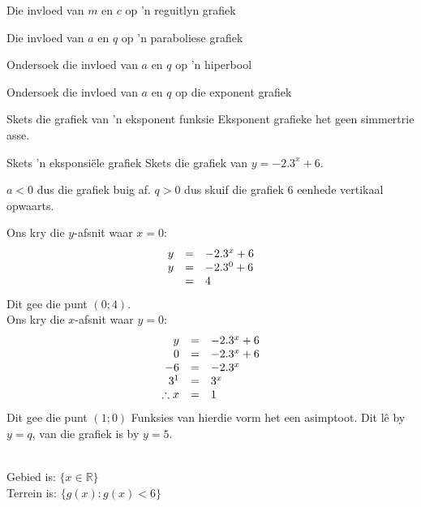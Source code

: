 \begin{Ondersoek}{Die invloed van $m$ en $c$ op 'n reguitlyn grafiek}
\begin{Ondersoek}{Die invloed van $a$ en $q$ op 'n paraboliese grafiek}
\begin{Ondersoek}{Ondersoek die invloed van $a$ en $q$ op 'n hiperbool}
\begin{Ondersoek}{Ondersoek die invloed van $a$ en $q$ op die exponent grafiek}
\begin{wex}{Skets die grafiek van 'n eksponent funksie}
{Eksponent grafieke het geen simmertrie asse.
} 
\end{wex}


 
\begin{wex}{Skets ’n eksponsiële grafiek}
{
Skets die grafiek van $y=-2.3^{x}+6$.}
{
 $a<0$ dus die grafiek buig af. $q>0$ dus skuif die grafiek $6$ eenhede vertikaal opwaarts.

Ons kry die $y$-afsnit waar $x=0$:
\begin{equation*}
\begin{array}{ccl}\hfill y& =& -2.3^{x}+6\hfill \\
 \hfill y& =& -2.3^{0}+6\hfill \\
 & =& 4\hfill \\

\end{array}
\end{equation*}
Dit gee die punt $(0;4)$.\\

Ons kry die $x$-afsnit waar $y=0$:
\begin{equation*}
\begin{array}{ccl}\hfill y& =& -2.3^{x}+6\hfill \\
 \hfill 0& =& -2.3^{x}+6\hfill \\
 \hfill -6& =& -2.3^{x}\hfill \\
 \hfill {3}^{1}& =& {3}^{x}\hfill \\
\hfill \therefore x & =& 1 
\end{array}
\end{equation*}
Dit gee die punt $(1; 0)$
Funksies van hierdie vorm het een asimptoot. Dit lê by $y=q$, van die grafiek is by $y=5$.



\\
Gebied is: $\{x \in \mathbb{R}\}$\\
Terrein is: $\{g(x): g(x) <6\}$\\

}
\end{wex}




\begin{exercises}{ }
 {
 
}
\end{exercises}
\end{Ondersoek}
\end{Ondersoek}
\end{Ondersoek}
\end{Ondersoek}
